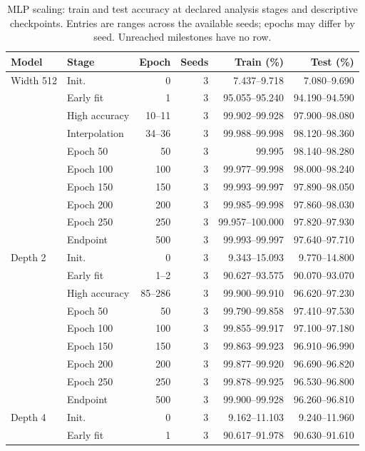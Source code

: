 \begin{table}[!htbp]\centering
\caption{MLP scaling: train and test accuracy at declared analysis stages and descriptive checkpoints. Entries are ranges across the available seeds; epochs may differ by seed. Unreached milestones have no row.}\label{tab:perf-1-3}
\small\setlength{\tabcolsep}{4pt}
\begin{tabular}{llrrrr}\toprule
Model & Stage & Epoch & Seeds & Train (\%) & Test (\%)\\\midrule
Width 512 & Init. & 0 & 3 & 7.437--9.718 & 7.080--9.690\\
 & Early fit & 1 & 3 & 95.055--95.240 & 94.190--94.590\\
 & High accuracy & 10--11 & 3 & 99.902--99.928 & 97.900--98.080\\
 & Interpolation & 34--36 & 3 & 99.988--99.998 & 98.120--98.360\\
 & Epoch 50 & 50 & 3 & 99.995 & 98.140--98.280\\
 & Epoch 100 & 100 & 3 & 99.977--99.998 & 98.000--98.240\\
 & Epoch 150 & 150 & 3 & 99.993--99.997 & 97.890--98.050\\
 & Epoch 200 & 200 & 3 & 99.985--99.998 & 97.860--98.030\\
 & Epoch 250 & 250 & 3 & 99.957--100.000 & 97.820--97.930\\
 & Endpoint & 500 & 3 & 99.993--99.997 & 97.640--97.710\\
\midrule
Depth 2 & Init. & 0 & 3 & 9.343--15.093 & 9.770--14.800\\
 & Early fit & 1--2 & 3 & 90.627--93.575 & 90.070--93.070\\
 & High accuracy & 85--286 & 3 & 99.900--99.910 & 96.620--97.230\\
 & Epoch 50 & 50 & 3 & 99.790--99.858 & 97.410--97.530\\
 & Epoch 100 & 100 & 3 & 99.855--99.917 & 97.100--97.180\\
 & Epoch 150 & 150 & 3 & 99.863--99.923 & 96.910--96.990\\
 & Epoch 200 & 200 & 3 & 99.877--99.920 & 96.690--96.820\\
 & Epoch 250 & 250 & 3 & 99.878--99.925 & 96.530--96.800\\
 & Endpoint & 500 & 3 & 99.900--99.928 & 96.260--96.810\\
\midrule
Depth 4 & Init. & 0 & 3 & 9.162--11.103 & 9.240--11.960\\
 & Early fit & 1 & 3 & 90.617--91.978 & 90.630--91.610\\

\end{tabular}
\end{table}
